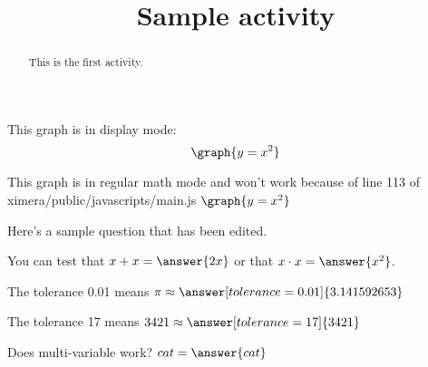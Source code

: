 \documentclass[handout]{ximera}
\title{Sample activity}
\begin{document}
\begin{abstract} This is the first activity.
\end{abstract}


\maketitle


This graph is in display mode:
\[ \graph{y=x^2} \]

This graph is in regular math mode and won't work because of line 113 of ximera/public/javascripts/main.js
\( \graph{y=x^2} \)

Here's a sample question that has been edited. 


\begin{problem}
\begin{multipleChoice}
\end{multipleChoice}
\end{problem}

\begin{problem}
   You can test that $x + x = \answer{2x}$ or that $x \cdot x = \answer{x^2}$.
\end{problem}

\begin{problem}
   The tolerance 0.01 means $\pi \approx \answer[tolerance=0.01]{3.141592653}$
\end{problem}

\begin{problem}
   The tolerance 17 means $3421 \approx \answer[tolerance=17]{3421}$
\end{problem}

\begin{problem}
Does multi-variable work? $ cat = \answer{cat}$
\end{problem}
\end{document}

